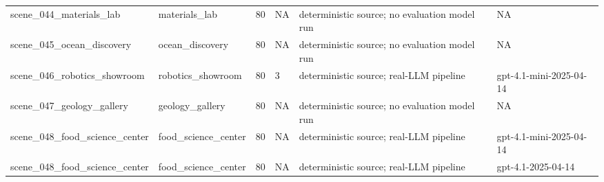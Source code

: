 \begin{tabular}{llllll}
scene\_044\_materials\_lab & materials\_lab & 80 & NA & deterministic source; no evaluation model run & NA \\
scene\_045\_ocean\_discovery & ocean\_discovery & 80 & NA & deterministic source; no evaluation model run & NA \\
scene\_046\_robotics\_showroom & robotics\_showroom & 80 & 3 & deterministic source; real-LLM pipeline & gpt-4.1-mini-2025-04-14 \\
scene\_047\_geology\_gallery & geology\_gallery & 80 & NA & deterministic source; no evaluation model run & NA \\
scene\_048\_food\_science\_center & food\_science\_center & 80 & NA & deterministic source; real-LLM pipeline & gpt-4.1-mini-2025-04-14 \\
scene\_048\_food\_science\_center & food\_science\_center & 80 & NA & deterministic source; real-LLM pipeline & gpt-4.1-2025-04-14 \\
\bottomrule
\end{tabular}
